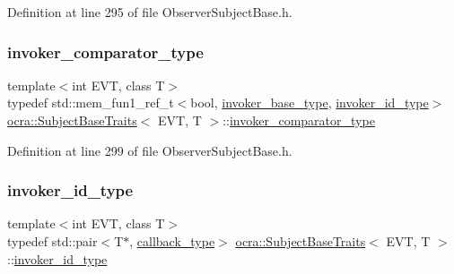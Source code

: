 Definition at line 295 of file Observer\+Subject\+Base.\+h.

\hypertarget{structocra_1_1SubjectBaseTraits_a791cf85201dfcbdc6213946c36d698ca}{}\label{structocra_1_1SubjectBaseTraits_a791cf85201dfcbdc6213946c36d698ca} 
\subsubsection{\texorpdfstring{invoker\+\_\+comparator\+\_\+type}{invoker\_comparator\_type}}
{\footnotesize\ttfamily template$<$int E\+VT, class T$>$ \\
typedef std\+::mem\+\_\+fun1\+\_\+ref\+\_\+t$<$bool, \hyperlink{structocra_1_1SubjectBaseTraitsBase_a439671662c8f8f3e80e6675f008dec3f}{invoker\+\_\+base\+\_\+type}, \hyperlink{structocra_1_1SubjectBaseTraits_a2c4f3af9b3e93bf96232c36df6f43986}{invoker\+\_\+id\+\_\+type}$>$ \hyperlink{structocra_1_1SubjectBaseTraits}{ocra\+::\+Subject\+Base\+Traits}$<$ E\+VT, T $>$\+::\hyperlink{structocra_1_1SubjectBaseTraits_a791cf85201dfcbdc6213946c36d698ca}{invoker\+\_\+comparator\+\_\+type}}



Definition at line 299 of file Observer\+Subject\+Base.\+h.

\hypertarget{structocra_1_1SubjectBaseTraits_a2c4f3af9b3e93bf96232c36df6f43986}{}\label{structocra_1_1SubjectBaseTraits_a2c4f3af9b3e93bf96232c36df6f43986} 
\subsubsection{\texorpdfstring{invoker\+\_\+id\+\_\+type}{invoker\_id\_type}}
{\footnotesize\ttfamily template$<$int E\+VT, class T$>$ \\
typedef std\+::pair$<$T$\ast$, \hyperlink{structocra_1_1SubjectBaseTraits_ab8c572ba6805d72ddf4137da6e2f4480}{callback\+\_\+type}$>$ \hyperlink{structocra_1_1SubjectBaseTraits}{ocra\+::\+Subject\+Base\+Traits}$<$ E\+VT, T $>$\+::\hyperlink{structocra_1_1SubjectBaseTraits_a2c4f3af9b3e93bf96232c36df6f43986}{invoker\+\_\+id\+\_\+type}}



